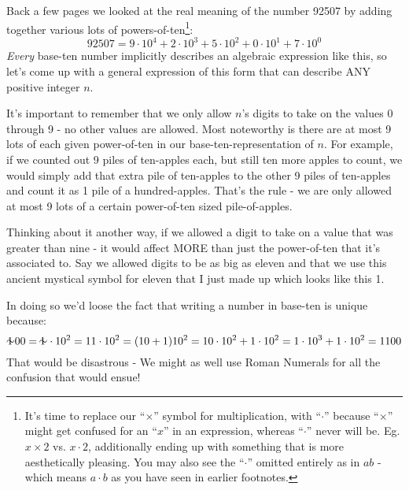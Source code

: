 \documentclass{article}
\begin{document}
Back a few pages we looked at the real meaning
of the number 92507 by adding together
various lots of powers-of-ten\footnote{It's time
to replace our ``$\times{}$'' symbol for multiplication, with ``$\cdot{}$''
because ``$\times{}$'' might get confused for an ``$x$'' in an expression,
whereas ``$\cdot{}$'' never will be. Eg. $x\times{}2$
vs. $x\cdot{}2$, additionally ending up with something that is more aesthetically pleasing.
You may also see the ``$\cdot$'' omitted entirely as
in $ab$ - which means $a\cdot{}b$ as you have seen in earlier footnotes.}:
\[92507=9{\cdot}10^4+2{\cdot}10^3+5{\cdot}10^2+0{\cdot}10^1+7{\cdot}10^0\]
\emph{Every} base-ten number implicitly describes an algebraic expression like this, so
let's come up
with a general expression of this form that can describe ANY positive integer $n$.

It's important to remember that we only allow $n$'s digits
to take on the values 0 through 9 - no other values are allowed.
Most noteworthy is there are at most 9 lots of each given
power-of-ten in our base-ten-representation of $n$.
For example, if we counted out 9 piles of ten-apples each,
but still ten more apples to count,
we would simply add that extra pile of ten-apples
to the other 9 piles of ten-apples and count it as 1 pile of a hundred-apples.
That's the rule - we are only allowed
at most 9 lots of a certain power-of-ten sized pile-of-apples.

Thinking about it another way, if we allowed a digit to take on a value
that was greater than nine - it would affect
MORE than just the power-of-ten that it's associated to.
Say we allowed digits to be as big as eleven and
that we use this ancient mystical symbol for eleven that I just
made up which looks like this {1\hspace{-0.6em}\raisebox{0.05em}{$\sim$}}.

In doing so we'd loose the fact that writing a number in base-ten is unique because:
\[\text{1\hspace{-0.6em}\raisebox{0.05em}{$\sim$}}00 =\text{1\hspace{-0.6em}\raisebox{0.05em}{$\sim$}}\cdot{}10^2 = 11\cdot10^2=(10+1)10^2=10\cdot10^2+1\cdot10^2=1\cdot10^3+1\cdot10^2=1100\]
That would be disastrous - We might as well use Roman Numerals for all
the confusion that would ensue!
\bigskip
\end{document}
